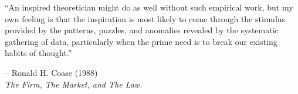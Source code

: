 
%
%
%

\begin{dedicationQ}

``An inspired theoretician might do as well without such empirical work, but my own feeling is that the inspiration is most likely to come through the stimulus provided by the patterns, puzzles, and anomalies revealed by the systematic gathering of data, particularly when the prime 
need is to break our existing habits of thought.''\\

\begin{flushright}
-- Ronald H. Coase (1988)\\
\textit{The Firm, The Market, and The Law.}
\end{flushright}

\end{dedicationQ}




